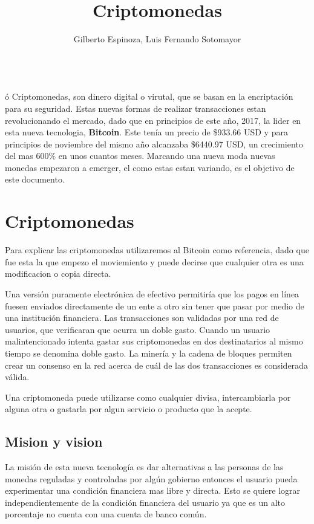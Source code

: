 \documentclass[12pt,letterpaper]{article}
\title{Criptomonedas}
\author{Gilberto Espinoza, Luis Fernando Sotomayor}
\begin{document}
\maketitle
\abstractname{\\ó Criptomonedas, son dinero digital o virutal, que se basan en la encriptaci\'on para su seguridad. Estas nuevas formas de realizar transacciones estan revolucionando el mercado, dado que en principios de este a\~no, 2017, la lider en esta nueva tecnologia, \textbf{Bitcoin}. Este ten\'ia un precio de \$933.66 USD y para principios de noviembre del mismo a\~no alcanzaba \$6440.97 USD, un crecimiento del mas 600\% en unos cuantos meses. Marcando una nueva moda nuevas monedas empezaron a emerger, el como estas estan variando, es el objetivo de este documento. }

\section*{Criptomonedas}
	Para explicar las criptomonedas utilizaremos al Bitcoin como referencia, dado que fue esta la que empezo el moviemiento y puede decirse que cualquier otra es una modificacion o copia directa.

	Una versi\'on puramente electr\'onica de efectivo permitir\'ia que los pagos en l\'inea fuesen enviados directamente de un ente a otro sin tener que pasar por medio de una instituci\'on financiera. Las transacciones son validadas por una red de usuarios, que verificaran que ocurra un doble gasto. Cuando un usuario malintencionado intenta gastar sus criptomonedas en dos destinatarios al mismo tiempo se denomina doble gasto. La miner\'ia y la cadena de bloques permiten crear un consenso en la red acerca de cu\'al de las dos transacciones es considerada v\'alida.
	
	Una criptomoneda puede utilizarse como cualquier divisa, intercambiarla por alguna otra o gastarla por algun servicio o producto que la acepte.
	\subsection*{Mision y vision}
	La misi\'on de esta nueva tecnolog\'ia es dar alternativas a las personas de las monedas reguladas y controladas por alg\'un gobierno entonces el usuario pueda experimentar una condici\'on financiera mas libre y directa. Esto se quiere lograr independientemente de la condici\'on financiera del usuario ya que es un alto porcentaje no cuenta con una cuenta de banco com\'un.
	
\end{document}
